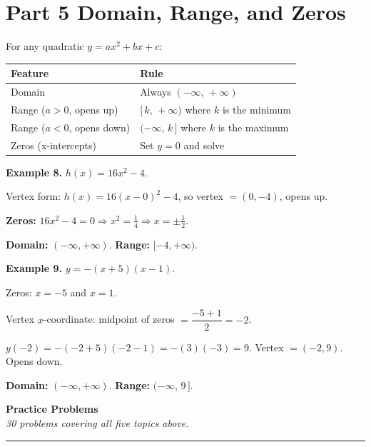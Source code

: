 \documentclass[11pt]{article}
\begin{document}
\section*{Part 5 \quad Domain, Range, and Zeros}

For any quadratic $y = ax^2 + bx + c$:

\begin{center}
\renewcommand{\arraystretch}{1.6}
\begin{tabular}{|l|l|}
\hline
\textbf{Feature}  & \textbf{Rule} \\
\hline
Domain            & Always $(-\infty,\, +\infty)$ \\
Range ($a > 0$, opens up)  & $[\,k,\, +\infty)$ where $k$ is the minimum \\
Range ($a < 0$, opens down) & $(-\infty,\, k\,]$ where $k$ is the maximum \\
Zeros (x-intercepts)  & Set $y = 0$ and solve \\
\hline
\end{tabular}
\end{center}

\begin{exbox}
\textbf{Example 8.} $h(x) = 16x^2 - 4$.

Vertex form: $h(x) = 16(x-0)^2 - 4$, so vertex $= (0, -4)$, opens up.

\textbf{Zeros:} $16x^2 - 4 = 0 \Rightarrow x^2 = \tfrac{1}{4} \Rightarrow x = \pm\tfrac{1}{2}$.

\textbf{Domain:} $(-\infty, +\infty)$. \quad \textbf{Range:} $[-4, +\infty)$.
\end{exbox}

\begin{exbox}
\textbf{Example 9.} $y = -(x+5)(x-1)$.

Zeros: $x = -5$ and $x = 1$.

Vertex $x$-coordinate: midpoint of zeros $= \dfrac{-5+1}{2} = -2$.

$y(-2) = -(-2+5)(-2-1) = -(3)(-3) = 9$. \quad Vertex $= (-2, 9)$. Opens down.

\textbf{Domain:} $(-\infty, +\infty)$. \quad \textbf{Range:} $(-\infty,\, 9\,]$.
\end{exbox}

\newpage
\begin{center}
  {\Large\textbf{Practice Problems}}\\[4pt]
  \textit{30 problems covering all five topics above.}
\end{center}
\hrule
\vspace{0.4cm}
\end{document}
